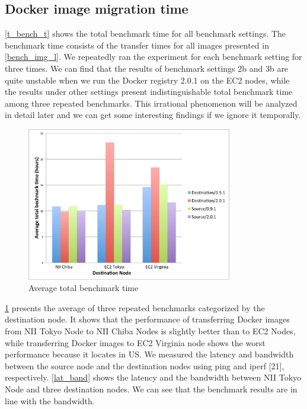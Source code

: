 \documentclass{ieicej}
\begin{document}
\subsection{Docker image migration time}
\cref{t_bench_t} shows the total benchmark time for all benchmark settings. The benchmark time consists of the transfer times for all images presented in \cref{bench_img_l}.
We repeatedly ran the experiment for each benchmark setting for three times.
We can find that the results of benchmark settings 2b and 3b are quite unstable when we run the Docker registry 2.0.1 on the EC2 nodes, while the results under other settings present indistinguishable total benchmark time among three repeated benchmarks.
This irrational phenomenon will be analyzed in detail later and we can get some interesting findings if we ignore it temporally.

\begin{figure}[ht]
  \begin{center}
  \includegraphics[width=0.8\textwidth,natwidth=1000,natheight=800]{3_Average_total_benchmark_time.pdf}
  \end{center}
  \caption{Average total benchmark time}
  \label{avg_bench_time}
\end{figure}


\cref{avg_bench_time} presents the average of three repeated benchmarks categorized by the destination node.
It shows that the performance of transferring Docker images from NII Tokyo Node to NII Chiba Nodes is slightly better than to EC2 Nodes, while transferring Docker images to EC2 Virginia node shows the worst performance because it locates in US.
We measured the latency and bandwidth between the source node and the destination nodes using ping and iperf [21], respectively.
\cref{lat_band} shows the latency and the bandwidth between NII Tokyo Node and three destination nodes. We can see that the benchmark results are in line with the bandwidth.
\end{document}
